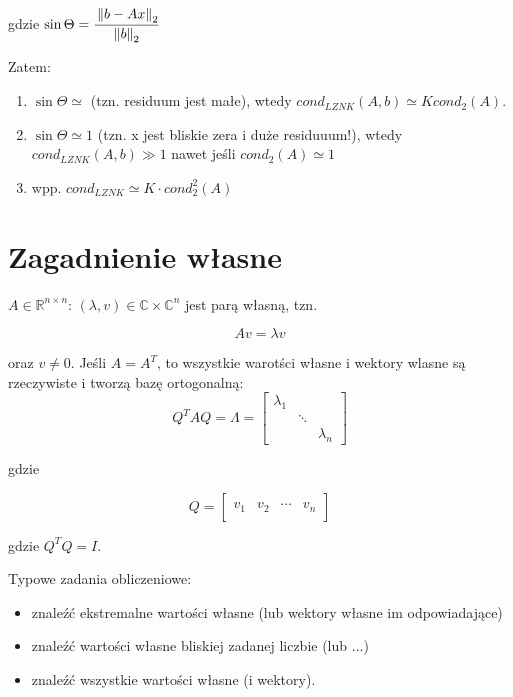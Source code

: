 \documentclass[hidelinks,a4paper]{article}
\newcommand{\RR}{\mathbb{R}}
\newcommand{\CC}{\mathbb{C}}
\newcommand{\norm}[1]{\left\lVert#1\right\rVert}
\begin{document}
gdzie $\sin{\Theta} = \cfrac{\norm{b - Ax}_2}{\norm{b}_2}$

Zatem:

\begin{enumerate}
	\item $\sin\Theta \simeq$ (tzn. residuum jest małe), wtedy $cond_{LZNK}(A, b) \simeq K cond_2(A)$.
	      	
	\item $\sin\Theta \simeq 1$ (tzn. x jest bliskie zera i duże residuuum!), wtedy $cond_{LZNK}(A, b)\gg 1$ nawet jeśli $cond_2(A) \simeq 1$
	      	
	\item wpp. $cond_{LZNK} \simeq K \cdot cond_2^2(A)$
\end{enumerate}

\section{Zagadnienie własne}

$A \in \RR^{n \times n}$: $(\lambda, v) \in \CC \times \CC^n$ jest parą własną, tzn.

\[
	Av = \lambda v
\]

oraz $v \neq 0$. Jeśli $A = A^T$, to wszystkie warotści własne i wektory wlasne są rzeczywiste i tworzą bazę ortogonalną:
\[
	Q^TAQ = \Lambda = \left[\begin{array}{ccc}
	\lambda_1 &  & \\ 
	&  \ddots & \\ 
	&  & \lambda_n
	\end{array}\right]
\]

gdzie

\[
	Q = \left[ \begin{array}{c|c|c|c} & & & \\ v_1 & v_2 & \cdots & v_n \\ & & & \end{array} \right]
\]

gdzie $Q^TQ = I$.

Typowe zadania obliczeniowe:

\begin{itemize}
	\item znaleźć ekstremalne wartości własne (lub wektory własne im odpowiadające)
	\item znaleźć wartości własne bliskiej zadanej liczbie (lub ...)
	\item znaleźć wszystkie wartości własne (i wektory).
\end{itemize}
\end{document}
